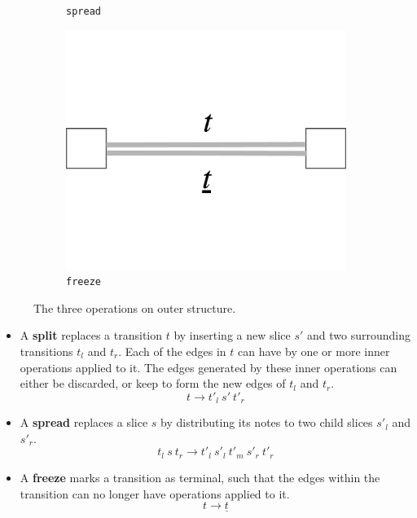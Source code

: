 \documentclass[12pt,a4paper,twoside,openright]{report}
\theoremstyle{definition}
\begin{document}
\begin{figure}
\begin{subfigure}[t]{.46\textwidth}
    \caption{\texttt{spread}}
    \label{fig:spreadOP}
  \end{subfigure}
  \begin{subfigure}[t]{.24\textwidth}
    \centering\includegraphics[keepaspectratio,width=\textwidth]{prep/outer/freeze}
    \caption{\texttt{freeze}}
    \label{fig:freezeOp}
  \end{subfigure}
  \centering
  \captionsetup{width=.9\linewidth}
  \caption{The three operations on outer structure. }
  \label{fig:outerOperations}
\end{figure}

\begin{itemize}
  \item A \textbf{split} replaces a transition $t$ by inserting a new slice $s'$ and two surrounding transitions $t_l$ and $t_r$. Each of the edges in $t$ can have by one or more inner operations applied to it. The edges generated by these inner operations can either be discarded, or keep to form the new edges of $t_l$ and $t_r$.
\begin{equation}
  t \to t'_l~s'~t'_r
  \label{eq:splitrule}
\end{equation}
  \item A \textbf{spread} replaces a slice $s$ by distributing its notes to two child slices $s'_l$ and $s'_r$. 
\begin{equation}
  t_l~s~t_r \to t'_l~s'_l~t'_m~s'_r~t'_r
  \label{eq:spreadrule}
\end{equation}
\item A \textbf{freeze} marks a transition as terminal, such that the edges within the transition can no longer have operations applied to it. 
\begin{equation}
  t \to \underline{t}
  \label{eq:freezerule}
\end{equation}
\end{itemize}
\end{document}

